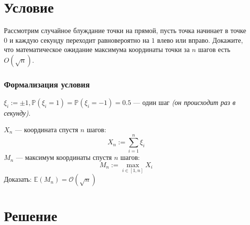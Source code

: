 

\DeclareMathOperator*{\argmin}{arg\,min}



\section*{Условие}

Рассмотрим случайное блуждание точки на прямой, пусть точка начинает в точке $0$ и каждую секунду переходит равновероятно на $1$ влево или вправо. Докажите, что математическое ожидание максимума координаты точки за $n$ шагов есть $O(\sqrt n)$.

\subsubsection*{Формализация условия}

$\xi_i:=\pm 1, \mathbb P(\xi_i=1)=\mathbb P(\xi_i=-1)=0.5$ --- один шаг \textit{(он происходит раз в секунду)}.

$X_n$ --- координата спустя $n$ шагов:
$$X_n:=\sum_{i=1}^n \xi_i$$
$M_n$ --- максимум координаты спустя $n$ шагов:
$$M_n:=\max_{i\in[1, n]} X_i$$
Доказать: $\mathbb E (M_n)=\mathcal O(\sqrt n)$

\section*{Решение}


